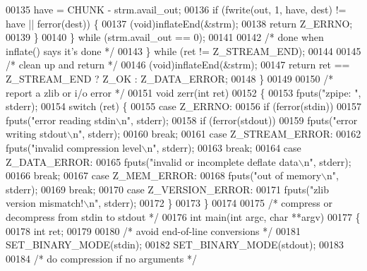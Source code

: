 \begin{DoxyCode}
00135             have = CHUNK - strm.avail\_out;
00136             \textcolor{keywordflow}{if} (fwrite(out, 1, have, dest) != have || ferror(dest)) \{
00137                 (void)inflateEnd(&strm);
00138                 \textcolor{keywordflow}{return} Z\_ERRNO;
00139             \}
00140         \} \textcolor{keywordflow}{while} (strm.avail\_out == 0);
00141 
00142         \textcolor{comment}{/* done when inflate() says it's done */}
00143     \} \textcolor{keywordflow}{while} (ret != Z\_STREAM\_END);
00144 
00145     \textcolor{comment}{/* clean up and return */}
00146     (void)inflateEnd(&strm);
00147     \textcolor{keywordflow}{return} ret == Z\_STREAM\_END ? Z\_OK : Z\_DATA\_ERROR;
00148 \}
00149 
00150 \textcolor{comment}{/* report a zlib or i/o error */}
00151 \textcolor{keywordtype}{void} zerr(\textcolor{keywordtype}{int} ret)
00152 \{
00153     fputs(\textcolor{stringliteral}{"zpipe: "}, stderr);
00154     \textcolor{keywordflow}{switch} (ret) \{
00155     \textcolor{keywordflow}{case} Z\_ERRNO:
00156         \textcolor{keywordflow}{if} (ferror(stdin))
00157             fputs(\textcolor{stringliteral}{"error reading stdin\(\backslash\)n"}, stderr);
00158         \textcolor{keywordflow}{if} (ferror(stdout))
00159             fputs(\textcolor{stringliteral}{"error writing stdout\(\backslash\)n"}, stderr);
00160         \textcolor{keywordflow}{break};
00161     \textcolor{keywordflow}{case} Z\_STREAM\_ERROR:
00162         fputs(\textcolor{stringliteral}{"invalid compression level\(\backslash\)n"}, stderr);
00163         \textcolor{keywordflow}{break};
00164     \textcolor{keywordflow}{case} Z\_DATA\_ERROR:
00165         fputs(\textcolor{stringliteral}{"invalid or incomplete deflate data\(\backslash\)n"}, stderr);
00166         \textcolor{keywordflow}{break};
00167     \textcolor{keywordflow}{case} Z\_MEM\_ERROR:
00168         fputs(\textcolor{stringliteral}{"out of memory\(\backslash\)n"}, stderr);
00169         \textcolor{keywordflow}{break};
00170     \textcolor{keywordflow}{case} Z\_VERSION\_ERROR:
00171         fputs(\textcolor{stringliteral}{"zlib version mismatch!\(\backslash\)n"}, stderr);
00172     \}
00173 \}
00174 
00175 \textcolor{comment}{/* compress or decompress from stdin to stdout */}
00176 \textcolor{keywordtype}{int} main(\textcolor{keywordtype}{int} argc, \textcolor{keywordtype}{char} **argv)
00177 \{
00178     \textcolor{keywordtype}{int} ret;
00179 
00180     \textcolor{comment}{/* avoid end-of-line conversions */}
00181     SET\_BINARY\_MODE(stdin);
00182     SET\_BINARY\_MODE(stdout);
00183 
00184     \textcolor{comment}{/* do compression if no arguments */}

\end{DoxyCode}
